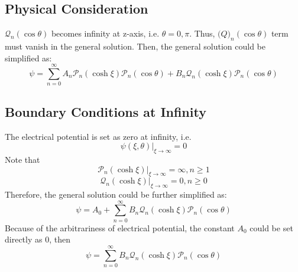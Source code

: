 \documentclass[fontsize=11pt, %
                             paper=a4, %
                             twoside, %
                             captions=tableheading,
                             index=totoc,
                             hyperref]{labbook}
\begin{document}
\subsection{Physical Consideration}
$\mathscr{Q}_n(\cos\theta)$ becomes infinity at z-axis, i.e. $\theta=0, \pi$. Thus, $\mathscr(Q)_n(\cos\theta)$ term must vanish in the general solution. Then, the general solution could be simplified as:
\begin{equation}
\psi=\sum_{n=0}^\infty A_n \mathscr{P}_n(\cosh\xi)\mathscr{P}_n(\cos\theta)+B_n\mathscr{Q}_n(\cosh\xi)\mathscr{P}_n(\cos\theta)
\end{equation}
\subsection{Boundary Conditions at Infinity}
The electrical potential is set as zero at infinity, i.e.
\begin{equation}
\psi(\xi,\theta)|_{\xi\rightarrow\infty}=0
\end{equation}
Note that
\begin{equation}
\mathscr{P}_n(\cosh\xi)|_{\xi\rightarrow\infty}=\infty, n\ge1
\end{equation}
\begin{equation}
\mathscr{Q}_n(\cosh\xi)|_{\xi\rightarrow\infty}=0,n\ge0
\end{equation}
Therefore, the general solution could be further simplified as:
\begin{equation}
\psi=A_0+\sum_{n=0}^\infty B_n \mathscr{Q}_n(\cosh\xi)\mathscr{P}_n(\cos\theta)
\end{equation}
Because of the arbitrariness of electrical potential, the constant $A_0$ could be set directly as 0, then
\begin{equation}
\psi=\sum_{n=0}^\infty B_n \mathscr{Q}_n(\cosh\xi)\mathscr{P}_n(\cos\theta)
\end{equation}
\end{document}

